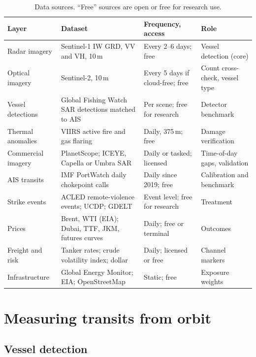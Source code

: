 \documentclass{article}
\begin{document}
\begin{table}[!tbp]
\centering
\small
\caption{Data sources. ``Free'' sources are open or free for research use.}
\label{tab:data}
\begin{tabularx}{\textwidth}{@{}L{2.55cm}L{4.1cm}L{3.15cm}Y@{}}
\toprule
Layer & Dataset & Frequency, access & Role \\
\midrule
Radar imagery & Sentinel-1 IW GRD, VV and VH, 10\,m & Every 2--6 days; free & Vessel detection (core) \\
 Optical imagery & Sentinel-2, 10\,m & Every 5 days if cloud-free; free & Count cross-check, vessel type \\
Vessel detections & Global Fishing Watch SAR detections matched to AIS & Per scene; free for research & Detector benchmark \\
 Thermal anomalies & VIIRS active fire and gas flaring & Daily, 375\,m; free & Damage verification \\
Commercial imagery & PlanetScope; ICEYE, Capella or Umbra SAR & Daily or tasked; licensed & Time-of-day gaps, validation \\
 AIS transits & IMF PortWatch daily chokepoint calls & Daily since 2019; free & Calibration and benchmark \\
Strike events & ACLED remote-violence events; UCDP; GDELT & Event level; free for research & Treatment \\
 Prices & Brent, WTI (EIA); Dubai, TTF, JKM, futures curves & Daily; free or terminal & Outcomes \\
Freight and risk & Tanker rates; crude volatility index; dollar & Daily; licensed or free & Channel markers \\
 Infrastructure & Global Energy Monitor; EIA; OpenStreetMap & Static; free & Exposure weights \\
\bottomrule
\end{tabularx}
\end{table}

\section{Measuring transits from orbit}
\label{sec:sat}

\subsection{Vessel detection}
\end{document}
